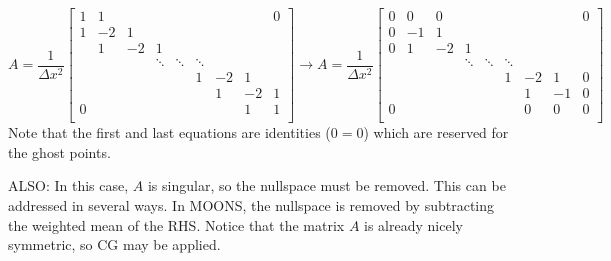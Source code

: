 \documentclass[landscape]{article}
\begin{document}
\[ A = \frac{1}{\Delta x^2} \left[\begin{array}{ccccccccc}
1  & 1     &           &           &           &           &           &         &  0 \\
1  & -2    & 1         &           &           &           &           &         &    \\
   & 1     & -2        & 1         &           &           &           &         &    \\
   &       &           & \ddots    & \ddots    & \ddots    &           &         &    \\
   &       &           &           &           & 1         & -2        & 1       &    \\
   &       &           &           &           &           &  1        & -2      &  1 \\
0  &       &           &           &           &           &           & 1       &  1 \\
\end{array} \right]
\rightarrow
A = \frac{1}{\Delta x^2} \left[\begin{array}{ccccccccc}
0  & 0     & 0         &           &           &           &           &         &  0 \\
0  & -1    & 1         &           &           &           &           &         &    \\
0  & 1     & -2        & 1         &           &           &           &         &    \\
   &       &           & \ddots    & \ddots    & \ddots    &           &         &    \\
   &       &           &           &           & 1         & -2        & 1       &  0 \\
   &       &           &           &           &           &  1        & -1      &  0 \\
0  &       &           &           &           &           &  0        & 0       &  0 \\
\end{array} \right]
\]
Note that the first and last equations are identities ($0=0$) which are reserved for the ghost points.

ALSO: In this case, $A$ is singular, so the nullspace must be removed. This can be addressed in several ways. In MOONS, the nullspace is removed by subtracting the weighted mean of the RHS. Notice that the matrix $A$ is already nicely symmetric, so CG may be applied.
\end{document}
